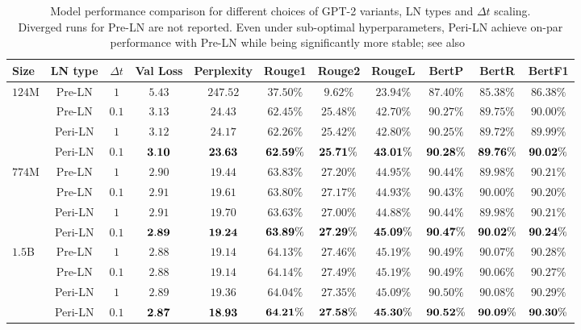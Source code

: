 \documentclass[journal]{IEEEtran}
\theoremstyle{plain}
\theoremstyle{definition}
\theoremstyle{remark}
\begin{document}
\begin{table}[t]
\centering
\caption{Model performance comparison for different choices of GPT-2 variants, LN types and $\Delta t$ scaling. \\
Diverged runs for Pre-LN are not reported. Even under sub-optimal hyperparameters, Peri-LN achieve on-par performance with Pre-LN while being significantly more stable; see also~}
\renewcommand{\arraystretch}{1.14}
\small
\begin{tabular}{lcccccccccc}
\toprule
Size & LN type & $\Delta t$ & Val Loss & Perplexity & Rouge1 & Rouge2 & RougeL & BertP & BertR & BertF1 \\
\midrule
\multirow{4}{*}{$124$M} 
  & Pre-LN  & $1$   & $5.43$ & $247.52$ & $37.50\%$ & $9.62\%$ & $23.94\%$ & $87.40\%$ & $85.38\%$ & $86.38\%$ \\
  & Pre-LN  & $0.1$ & $3.13$ & $24.43$  & $62.45\%$ & $25.48\%$ & $42.70\%$ & $90.27\%$ & $89.75\%$ & $90.00\%$ \\
  & Peri-LN & $1$   & $3.12$ & $24.17$  & $62.26\%$ & $25.42\%$ & $42.80\%$ & $90.25\%$ & $89.72\%$ & $89.99\%$ \\
  & Peri-LN & $0.1$ & $\bf 3.10$ & $\bf 23.63$ & $\bf 62.59\%$ & $\bf 25.71\%$ & $\bf 43.01\%$ & $\bf 90.28\%$ & $\bf 89.76\%$ & $\bf 90.02\%$ \\
\midrule
\multirow{4}{*}{$774$M}  
  & Pre-LN  & $1$   & $2.90$ & $19.44$ & $63.83\%$ & $27.20\%$ & $44.95\%$ & $90.44\%$ & $89.98\%$ & $90.21\%$ \\
  & Pre-LN  & $0.1$ & $2.91$ & $19.61$ & $63.80\%$ & $27.17\%$ & $44.93\%$ & $90.43\%$ & $90.00\%$ & $90.20\%$ \\
  & Peri-LN & $1$   & $2.91$ & $19.70$ & $63.63\%$ & $27.00\%$ & $44.88\%$ & $90.44\%$ & $89.98\%$ & $90.21\%$ \\
  & Peri-LN & $0.1$ & $\bf 2.89$ & $\bf 19.24$ & $\bf 63.89\%$ & $\bf 27.29\%$ & $\bf 45.09\%$ & $\bf 90.47\%$ & $\bf 90.02\%$ & $\bf 90.24\%$ \\
\midrule
\multirow{4}{*}{$1.5$B}
  & Pre-LN  & $1$   & $2.88$ & $19.14$ & $64.13\%$ & $27.46\%$ & $45.19\%$ & $90.49\%$ & $90.07\%$ & $90.28\%$ \\
  & Pre-LN  & $0.1$ & $2.88$ & $19.14$ & $64.14\%$ & $27.49\%$ & $45.19\%$ & $90.49\%$ & $90.06\%$ & $90.27\%$ \\
  & Peri-LN & $1$   & $2.89$ & $19.36$ & $64.04\%$ & $27.35\%$ & $45.09\%$ & $90.50\%$ & $90.08\%$ & $90.29\%$ \\
  & Peri-LN & $0.1$ & $\bf 2.87$ & $\bf 18.93$ & $\bf 64.21\%$ & $\bf 27.58\%$ & $\bf 45.30\%$ & $\bf 90.52\%$ & $\bf 90.09\%$ & $\bf 90.30\%$ \\
\bottomrule
\end{tabular}
\label{tab:gpt2_main}
\end{table}
\end{document}
